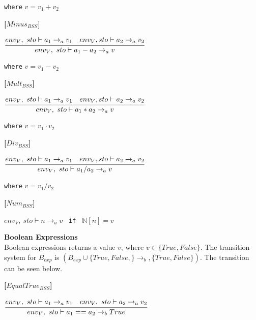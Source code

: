{\begin{center}
	
	\texttt{where} $v = v_1 + v_2$
\end{center}

\textbf{[$Minus_{BSS}$]}\\
\begin{center}
	\begin{math}
	\cfrac
		{env_V,\ sto \vdash a_1 \rightarrow_a v_1 \quad env_V, sto \vdash a_2 \rightarrow_a v_2}
		{env_V,\ sto \vdash a_1 - a_2 \rightarrow_a v}
	\end{math}
	
	
	\texttt{where} $v = v_1 - v_2$
\end{center}

\textbf{[$Mult_{BSS}$]}\\
\begin{center}
	\begin{math}
	\cfrac
	{env_V,\ sto \vdash a_1 \rightarrow_a v_1 \quad env_V, sto \vdash a_2 \rightarrow_a v_2}
	{env_V,\ sto \vdash a_1 * a_2 \rightarrow_a v}
	\end{math}
	
	
	\texttt{where} $v = v_1 \cdot v_2$
\end{center}

\textbf{[$Div_{BSS}$]}\\
\begin{center}
	\begin{math}
	\cfrac
	{env_V,\ sto \vdash a_1 \rightarrow_a v_1 \quad env_V, sto \vdash a_2 \rightarrow_a v_2}
	{env_V,\ sto \vdash a_1 / a_2 \rightarrow_a v}
	\end{math}
	
	
	\texttt{where} $v = v_1 / v_2$
\end{center}

\textbf{[$Num_{BSS}$]}\\
\begin{center}
	\begin{math}
		env_V,\ sto \vdash n \rightarrow_a v
	\end{math}
	\texttt{ if } $\mathbb{N}[n] = v$
\end{center}

\textbf{\large{Boolean Expressions}}\\
Boolean expressions returns a value $v$, where $v \in \{True, False\}$.
The transition-system for $B_{exp}$ is $(B_{exp} \cup \{True, False,\} \rightarrow_b, \{True, False\})$.
The transition can be seen below.

\textbf{[$EqualTrue_{BSS}$]}\\
\begin{center}
	\begin{math}
		\cfrac
			{env_V,\ sto \vdash a_1 \rightarrow_a v_1 \quad env_V,\ sto \vdash a_2 \rightarrow_a v_2}
			{env_V,\ sto \vdash a_1 == a_2 \rightarrow_b True}
	\end{math}
	

\end{center}}
